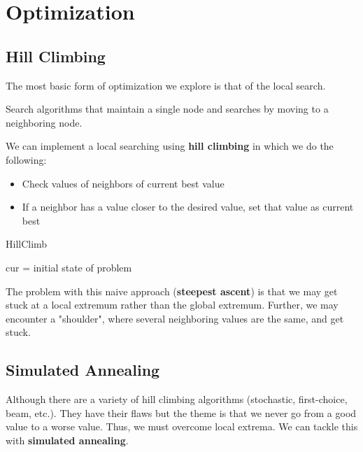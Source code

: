 \chapter{Optimization}
\section{Hill Climbing}
The most basic form of optimization we explore is that of the local search.

\begin{definition}
	Search algorithms that maintain a single node and searches by moving to a neighboring node.
\end{definition}

We can implement a local searching using \textbf{hill climbing} in which we do the following:
\begin{itemize}
	\item Check values of neighbors of current best value
	\item If a neighbor has a value closer to the desired value, set that value as current best
\end{itemize}

\begin{algorithm}[H]\label{HillClimb}
	\DontPrintSemicolon
	\caption{HillClimb}
	cur = initial state of problem \\
\end{algorithm}

The problem with this naive approach (\textbf{steepest ascent}) is that we may get stuck at a local extremum rather than the global extremum. Further, we may encounter a "shoulder", where several neighboring values are the same, and get stuck. \par

\section{Simulated Annealing}

Although there are a variety of hill climbing algorithms (stochastic, first-choice, beam, etc.). They have their flaws but the theme is that we never go from a good value to a worse value. Thus, we must overcome local extrema. We can tackle this with \textbf{simulated annealing}. 


